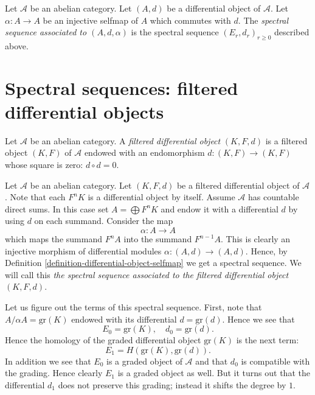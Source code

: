 \begin{definition}
\label{definition-differential-object-selfmap}
Let $\mathcal{A}$ be an abelian category.
Let $(A, d)$ be a differential object of $\mathcal{A}$.
Let $\alpha : A \to A$ be an injective selfmap of $A$ which
commutes with $d$. The {\it spectral sequence associated to
$(A, d, \alpha)$} is the spectral sequence
$(E_r, d_r)_{r \geq 0}$ described above.
\end{definition}
















\section{Spectral sequences: filtered differential objects}
\label{section-filtered-differential}

\begin{definition}
\label{definition-filtered-differential}
Let $\mathcal{A}$ be an abelian category.
A {\it filtered differential object} $(K, F, d)$ is a filtered object
$(K, F)$ of $\mathcal{A}$ endowed with an endomorphism
$d : (K, F) \to (K, F)$ whose square is zero: $d \circ d = 0$.
\end{definition}

\noindent
Let $\mathcal{A}$ be an abelian category.
Let $(K, F, d)$ be a filtered differential object of $\mathcal{A}$.
Note that each $F^nK$ is a differential object by itself.
Assume $\mathcal{A}$ has countable direct sums.
In this case set $A = \bigoplus F^nK$ and endow it with a differential
$d$ by using $d$ on each summand. Consider the map
$$
\alpha : A \to A
$$
which maps the summand $F^nA$ into the summand
$F^{n - 1}A$. This is clearly an injective morphism of differential
modules $\alpha : (A, d) \to (A, d)$. Hence, by
Definition \ref{definition-differential-object-selfmap}
we get a spectral sequence.
We will call this {\it the spectral sequence associated to
the filtered differential object $(K, F, d)$}.

\medskip\noindent
Let us figure out the terms of this spectral sequence.
First, note that $A/\alpha A = \text{gr}(K)$
endowed with its differential $d = \text{gr}(d)$. Hence we see that
$$
E_0 = \text{gr}(K), \quad d_0 = \text{gr}(d).
$$
Hence the homology of the graded differential object $\text{gr}(K)$
is the next term:
$$
E_1 = H(\text{gr}(K), \text{gr}(d)).
$$
In addition we see that $E_0$ is a graded object of $\mathcal{A}$
and that $d_0$ is compatible with the grading. Hence clearly $E_1$
is a graded object as well. But it turns out that the differential
$d_1$ does not preserve this grading; instead it shifts the degree by $1$.

